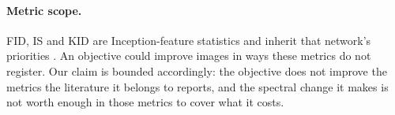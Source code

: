 \paragraph{Metric scope.}
FID, IS and KID are Inception-feature statistics and inherit that network's
priorities \citep{kynkaanniemi2023role, stein2023exposing}. An objective could
improve images in ways these metrics do not register. Our claim is bounded
accordingly: the objective does not improve the metrics the literature it
belongs to reports, and the spectral change it makes is not worth enough in
those metrics to cover what it costs.
